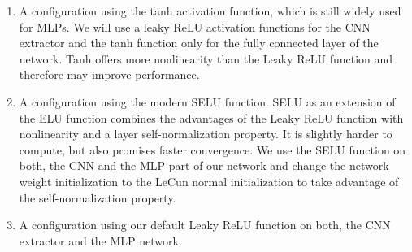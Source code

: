 \begin{enumerate}
    \item A configuration using the tanh activation function, which is still widely used for MLPs. We will use a leaky ReLU activation functions for the CNN extractor and the tanh function only for the fully connected layer of the network. Tanh offers more nonlinearity than the Leaky ReLU function and therefore may improve performance.
    \item A configuration using the modern SELU function. SELU as an extension of the ELU function combines the advantages of the Leaky ReLU function with nonlinearity and a layer self-normalization property. It is slightly harder to compute, but also promises faster convergence. We use the SELU function on both, the CNN and the MLP part of our network and change the network weight initialization to the LeCun normal initialization to take advantage of the self-normalization property.
    \item A configuration using our default Leaky ReLU function on both, the CNN extractor and the MLP network.
\end{enumerate}

